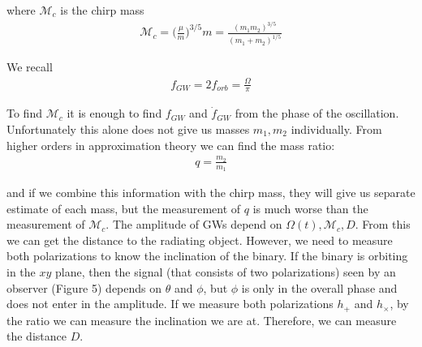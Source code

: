 \documentclass[11pt]{article}
\begin{document}
where $\mathcal{M}_c$ is the chirp mass 
\begin{align}
\mathcal{M}_c = \Bigg(\frac{\mu}{m}\Bigg)^{3/5}m = \frac{(m_1m_2)^{3/5}}{(m_1+m_2)^{1/5}}
\end{align}

We recall
\begin{align}
f_{GW} = 2f_{orb} = \frac{\Omega}{\pi}
\end{align}

To find $\mathcal{M}_c$ it is enough to find $f_{GW}$ and $\dot{f}_{GW}$ from the phase of the oscillation. Unfortunately this alone does not give us masses $m_1,m_2$ individually. From higher orders in approximation theory we can find the mass ratio:
\begin{align}
q = \frac{m_2}{m_1}
\end{align}

and if we combine this information with the chirp mass, they will give us separate estimate of each mass, but the measurement of $q$ is much worse than the measurement of $\mathcal{M}_c$.
The amplitude of GWs depend on $\Omega(t), \mathcal{M}_c,D$. From this we can get the distance to the radiating object. However, we need to measure both polarizations to know the inclination of the binary. If the binary is orbiting in the $xy$ plane, then the signal (that consists of two polarizations) seen by an observer (Figure 5) depends on $\theta$ and $\phi$, but $\phi$ is only in the overall phase and does not enter in the amplitude. If we measure both polarizations $h_+$ and $h_\times$, by the ratio we can measure the inclination we are at. Therefore, we can measure the distance $D$. 
\end{document}
